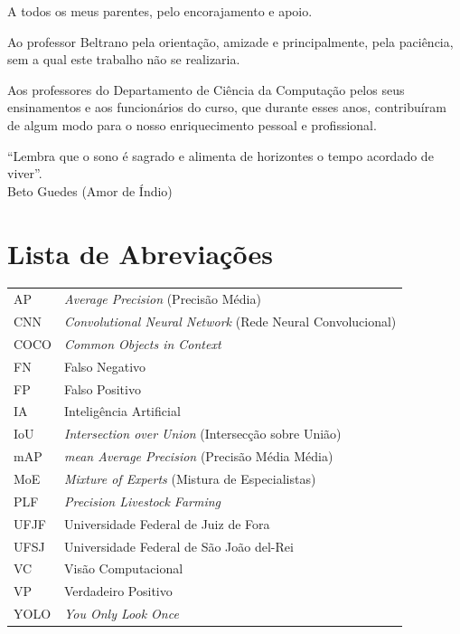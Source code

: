 \documentclass[a4paper,12pt]{monografia}
\theoremstyle{plain}
\theoremstyle{definition}
\theoremstyle{remark}
\begin{document}
 \indent\indent
A todos os meus parentes, pelo encorajamento e
apoio.

Ao professor Beltrano pela orientação, amizade e
principalmente, pela paciência, sem a qual este trabalho não se
realizaria.

Aos professores do Departamento de Ciência da Computação pelos seus
ensinamentos e aos funcionários do curso, que durante esses anos,
contribuíram de algum modo para o nosso enriquecimento pessoal e
profissional.
\newpage

\begin{epigrafe}
  ``Lembra que o sono é sagrado e alimenta de horizontes o tempo acordado de viver''.\\
  \hfill Beto Guedes (Amor de Índio)
\end{epigrafe}

\tableofcontents \thispagestyle{empty} \listoffigures
\thispagestyle{empty} \listoftables \thispagestyle{empty}

\chapter*{Lista de Abreviações} 
\doublespacing
\begin{tabular}{l l}

  AP & \textit{Average Precision} (Precisão Média) \\
  CNN & \textit{Convolutional Neural Network} (Rede Neural Convolucional) \\
  COCO & \textit{Common Objects in Context} \\
  FN & Falso Negativo \\
  FP & Falso Positivo \\
  IA & Inteligência Artificial \\
  IoU & \textit{Intersection over Union} (Intersecção sobre União) \\
  mAP & \textit{mean Average Precision} (Precisão Média Média) \\
  MoE & \textit{Mixture of Experts} (Mistura de Especialistas) \\
  PLF & \textit{Precision Livestock Farming} \\
  UFJF & Universidade Federal de Juiz de Fora \\
  UFSJ & Universidade Federal de São João del-Rei \\
  VC & Visão Computacional \\
  VP & Verdadeiro Positivo \\
  YOLO & \textit{You Only Look Once} \\

\end{tabular}  \thispagestyle{empty}
\end{document}

